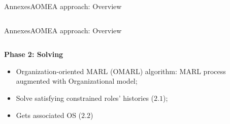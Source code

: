 \begin{frame}{Annexes}{AOMEA approach: Overview}
\begin{columns}
    \end{columns}

\end{frame}


\begin{frame}{Annexes}{AOMEA approach: Overview}

    \begin{columns}

        \begin{column}{0.6\textwidth}

            \textbf{Phase 2: Solving}

            \begin{itemize}
                \item Organization-oriented MARL (OMARL) algorithm: MARL process augmented with Organizational model;
                \item Solve satisfying constrained roles' histories ($2.1$);
                \item Gets associated OS ($2.2$)
            \end{itemize}

        \end{column}


\end{columns}
\end{frame}
